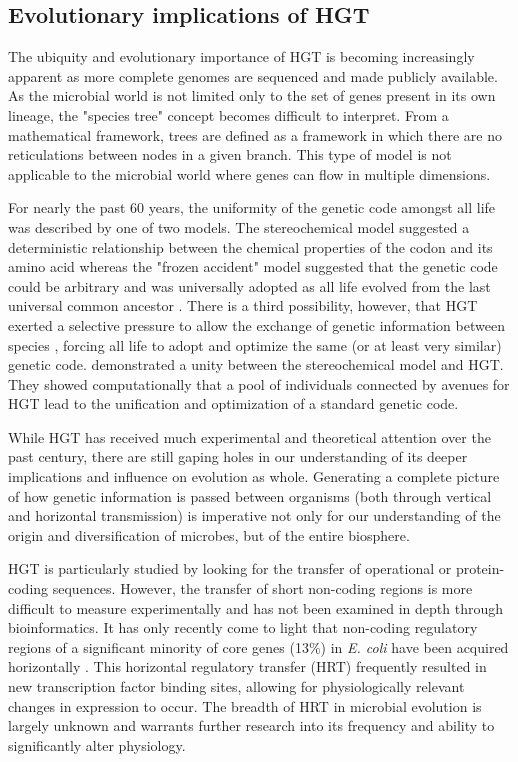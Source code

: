 \subsection*{Evolutionary implications of HGT}

The ubiquity and evolutionary importance of HGT is becoming increasingly
apparent as more complete genomes are sequenced and made publicly available. As
the microbial world is not limited only to the set of genes present in its own
lineage, the "species tree" concept becomes difficult to interpret. From a
mathematical framework, trees are defined as a framework in which there are no
reticulations between nodes in a given branch. This type of model is not
applicable to the microbial world where genes can flow in multiple dimensions.

For nearly the past 60 years, the uniformity of the
genetic code amongst all life was described by one of two models. The
stereochemical model suggested a deterministic relationship between the chemical
properties of the codon and its amino acid \cite{Grafstein:1983wv} whereas the
"frozen accident" model suggested that the genetic code could be arbitrary and
was universally adopted as all life evolved from the last universal common
ancestor \cite{Crick:1968wg}. There is a third possibility, however, that HGT
exerted a selective pressure to allow the exchange of genetic information
between species \cite{Syvanen:1985vv, Syvanen:2012jn}, forcing all life to adopt
and optimize the same (or at least very similar) genetic
code. \citet{Vestigian:2006va} demonstrated a unity between the stereochemical model
and HGT. They showed computationally that a pool of individuals connected by
avenues for HGT lead to the unification and optimization of a standard genetic
code. 

While HGT has received much experimental and theoretical attention over the past
century, there are still gaping holes in our understanding of its deeper
implications and influence on evolution as whole. Generating a complete picture
of how genetic information is passed between organisms (both through vertical
and horizontal transmission) is imperative not only for our understanding of the
origin and diversification of microbes, but of the entire biosphere.

HGT is particularly studied by looking for the transfer of operational or
protein-coding sequences. However, the transfer of short non-coding regions is
more difficult to measure experimentally and has not been examined in depth
through bioinformatics. It has only recently come to light that non-coding
regulatory regions of a significant minority of core genes (13\%) in \textit{E.
coli} have been acquired horizontally \cite{Oren:2014ee}. This horizontal
regulatory transfer (HRT) frequently resulted in new transcription factor
binding sites, allowing for physiologically relevant changes in expression to
occur. The breadth of HRT in microbial evolution is largely unknown and warrants
further research into its frequency and ability to significantly alter
physiology.


